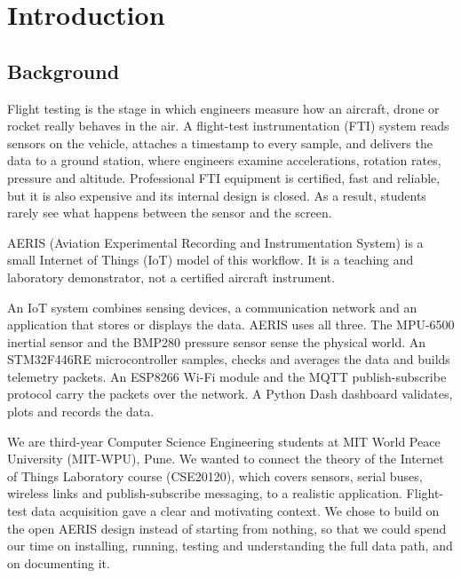 \documentclass[12pt,a4paper]{report}
\begin{document}
\clearpage
{}

\chapter{Introduction}
\section{Background}
Flight testing is the stage in which engineers measure how an aircraft, drone or rocket really behaves in the air. A flight-test instrumentation (FTI) system reads sensors on the vehicle, attaches a timestamp to every sample, and delivers the data to a ground station, where engineers examine accelerations, rotation rates, pressure and altitude. Professional FTI equipment is certified, fast and reliable, but it is also expensive and its internal design is closed. As a result, students rarely see what happens between the sensor and the screen.

AERIS (Aviation Experimental Recording and Instrumentation System) is a small Internet of Things (IoT) model of this workflow. It is a teaching and laboratory demonstrator, not a certified aircraft instrument.

An IoT system combines sensing devices, a communication network and an application that stores or displays the data. AERIS uses all three. The MPU-6500 inertial sensor and the BMP280 pressure sensor sense the physical world. An STM32F446RE microcontroller samples, checks and averages the data and builds telemetry packets. An ESP8266 Wi-Fi module and the MQTT publish-subscribe protocol carry the packets over the network. A Python Dash dashboard validates, plots and records the data.

We are third-year Computer Science Engineering students at MIT World Peace University (MIT-WPU), Pune. We wanted to connect the theory of the Internet of Things Laboratory course (CSE20120), which covers sensors, serial buses, wireless links and publish-subscribe messaging, to a realistic application. Flight-test data acquisition gave a clear and motivating context. We chose to build on the open AERIS design instead of starting from nothing, so that we could spend our time on installing, running, testing and understanding the full data path, and on documenting it.
\end{document}
